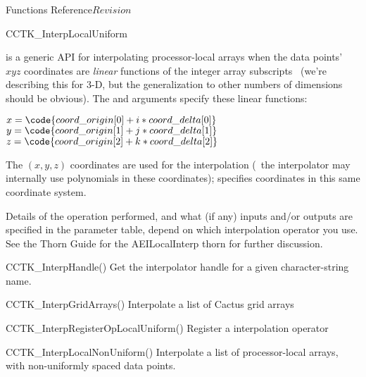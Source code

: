 \begin{cactuspart}{ Functions Reference}{}{$Revision$}
\begin{FunctionDescription}{CCTK\_InterpLocalUniform}
\begin{Discussion}
 is a generic API for interpolating
processor-local arrays when the data points'~$xyz$ coordinates are
{\em linear\/} functions of the integer array subscripts~
(we're describing this for 3-D, but the generalization to other numbers
of dimensions should be obvious).  The  and
 arguments specify these linear functions:
\begin{flushleft}
$x = \code{coord\_origin[0] + i*coord\_delta[0]}$ \\
$y = \code{coord\_origin[1] + j*coord\_delta[1]}$ \\
$z = \code{coord\_origin[2] + k*coord\_delta[2]}$ %
\end{flushleft}
The $(x,y,z)$ coordinates are used for the interpolation
(\ie{}~the interpolator may internally use polynomials in these
coordinates);  specifies coordinates in this
same coordinate system.

Details of the operation performed, and what (if any) inputs and/or
outputs are specified in the parameter table, depend on which interpolation
operator you use.  See the Thorn Guide for the AEILocalInterp thorn for
further discussion.
\end{Discussion}

\begin{SeeAlsoSection}
\begin{SeeAlso}{CCTK\_InterpHandle()}
Get the interpolator handle for a given character-string name.
\end{SeeAlso}
\begin{SeeAlso}{CCTK\_InterpGridArrays()}
Interpolate a list of Cactus grid arrays
\end{SeeAlso}
\begin{SeeAlso}{CCTK\_InterpRegisterOpLocalUniform()}
\hbox{}
Register a  interpolation operator
\end{SeeAlso}
\begin{SeeAlso}{CCTK\_InterpLocalNonUniform()}
Interpolate a list of processor-local arrays,
with non-uniformly spaced data points.
\end{SeeAlso}
\end{SeeAlsoSection}


\end{FunctionDescription}
\end{cactuspart}
